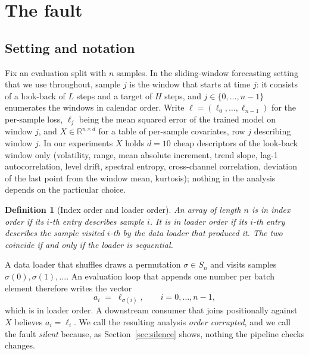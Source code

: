 \documentclass[a4paper,fleqn]{cas-sc}
\newtheorem{definition}[proposition]{Definition}
\begin{document}
\section{The fault}
\label{sec:fault}

\subsection{Setting and notation}

Fix an evaluation split with $n$ samples. In the sliding-window forecasting setting
that we use throughout, sample $j$ is the window that starts at time $j$: it
consists of a look-back of $L$ steps and a target of $H$ steps, and
$j \in \{0,\dots,n-1\}$ enumerates the windows in calendar order. Write
$\ell = (\ell_0,\dots,\ell_{n-1})$ for the per-sample loss, $\ell_j$ being the mean
squared error of the trained model on window $j$, and $X \in \mathbb{R}^{n\times d}$
for a table of per-sample covariates, row $j$ describing window $j$. In our
experiments $X$ holds $d = 10$ cheap descriptors of the look-back window only
(volatility, range, mean absolute increment, trend slope, lag-1 autocorrelation,
level drift, spectral entropy, cross-channel correlation, deviation of the last
point from the window mean, kurtosis); nothing in the analysis depends on the
particular choice.

\begin{definition}[Index order and loader order]
\label{def:orders}
An array of length $n$ is in \emph{index order} if its $i$-th entry describes
sample $i$. It is in \emph{loader order} if its $i$-th entry describes the sample
visited $i$-th by the data loader that produced it. The two coincide if and only
if the loader is sequential.
\end{definition}

A data loader that shuffles draws a permutation $\sigma \in S_n$ and visits
samples $\sigma(0), \sigma(1), \dots$. An evaluation loop that appends one number
per batch element therefore writes the vector
\begin{equation}
a_i \;=\; \ell_{\sigma(i)}, \qquad i = 0,\dots,n-1 ,
\label{eq:defect}
\end{equation}
which is in loader order. A downstream consumer that joins positionally against
$X$ believes $a_i = \ell_i$. We call the resulting analysis \emph{order
corrupted}, and we call the fault \emph{silent} because, as
Section~\ref{sec:silence} shows, nothing the pipeline checks changes.
\end{document}
